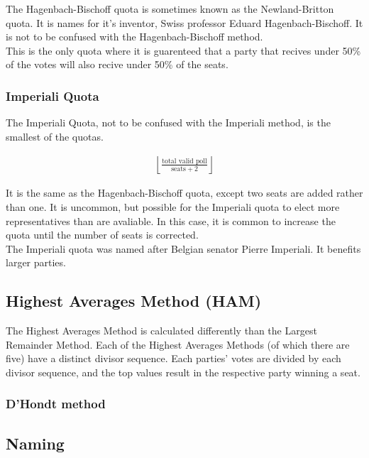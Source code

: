 \documentclass{article}
\begin{document}
    The Hagenbach-Bischoff quota is sometimes known as the Newland-Britton quota. It is names for it's inventor, Swiss professor Eduard Hagenbach-Bischoff. It is not to be confused with the Hagenbach-Bischoff method.\\

    This is the only quota where it is guarenteed that a party that recives under 50\% of the votes will also recive under 50\% of the seats.

    \subsubsection{Imperiali Quota}

    The Imperiali Quota, not to be confused with the Imperiali method, is the smallest of the quotas.

    \begin{align}
        \left \lfloor \frac{\text{total valid poll}}{\text{seats} + 2} \right \rfloor
    \end{align}

    It is the same as the Hagenbach-Bischoff quota, except two seats are added rather than one. It is uncommon, but possible for the Imperiali quota to elect more representatives than are avaliable. In this case, it is common to increase the quota until the number of seats is corrected.\\

    The Imperiali quota was named after Belgian senator Pierre Imperiali. It benefits larger parties.

    \subsection{Highest Averages Method (HAM)}

    The Highest Averages Method is calculated differently than the Largest Remainder Method. Each of the Highest Averages Methods (of which there are five) have a distinct divisor sequence. Each parties' votes are divided by each divisor sequence, and the top values result in the respective party winning a seat.\\

    \subsubsection{D'Hondt method}

    \subsection{Naming}
\end{document}
